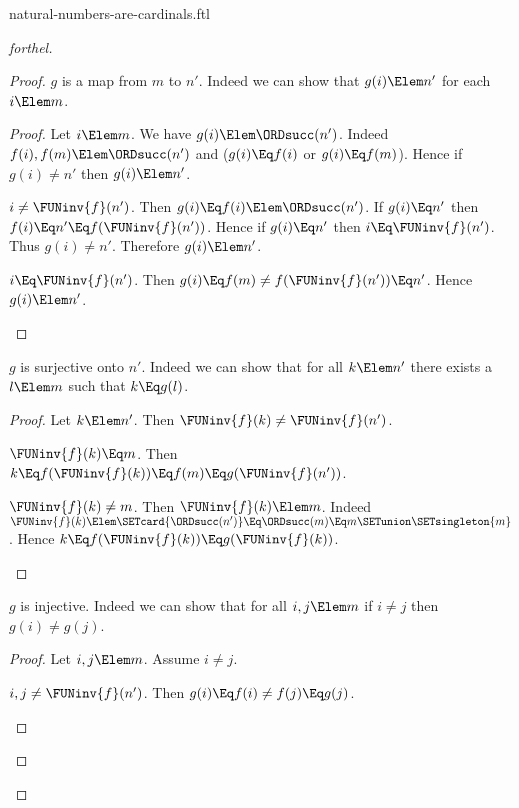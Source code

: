 \documentclass{stex}
\begin{document}
\begin{smodule}{natural-numbers-are-cardinals.ftl}
\begin{proof}[forthel]
\begin{proof}
      $g$ is a map from $m$ to $n'$.
      Indeed we can show that $g(i) \Elem n'$ for each $i \Elem m$.
      \begin{proof}
        Let $i \Elem m$.
        We have $g(i) \Elem \ORDsucc(n')$.
        Indeed $f(i), f(m) \Elem \ORDsucc(n')$ and ($g(i) \Eq f(i)$ or $g(i) \Eq f(m)$).
        Hence if $g(i) \neq n'$ then $g(i) \Elem n'$.

        \begin{case}{$i \neq \FUNinv{f}(n')$.}
          Then $g(i) \Eq f(i) \Elem \ORDsucc(n')$.
          If $g(i) \Eq n'$ then $f(i) \Eq n' \Eq f(\FUNinv{f}(n'))$.
          Hence if $g(i) \Eq n'$ then $i \Eq \FUNinv{f}(n')$.
          Thus $g(i) \neq n'$.
          Therefore $g(i) \Elem n'$.
        \end{case}

        \begin{case}{$i \Eq \FUNinv{f}(n')$.}
          Then $g(i)
            \Eq f(m)
            \neq f(\FUNinv{f}(n'))
            \Eq n'$.
          Hence $g(i) \Elem n'$.
        \end{case}
      \end{proof}

      $g$ is surjective onto $n'$.
      Indeed we can show that for all $k \Elem n'$ there exists a $l \Elem m$ such that $k \Eq g(l)$.
      \begin{proof}
        Let $k \Elem n'$.
        Then $\FUNinv{f}(k) \neq \FUNinv{f}(n')$.

        \begin{case}{$\FUNinv{f}(k) \Eq m$.}
          Then $k
            \Eq f(\FUNinv{f}(k))
            \Eq f(m)
            \Eq g(\FUNinv{f}(n'))$.
        \end{case}

        \begin{case}{$\FUNinv{f}(k) \neq m$.}
          Then $\FUNinv{f}(k) \Elem m$.
          Indeed $\FUNinv{f}(k) \Elem \SETcard{\ORDsucc(n')} \Eq \ORDsucc(m) \Eq m \SETunion \SETsingleton{m}$.
          Hence $k
            \Eq f(\FUNinv{f}(k))
            \Eq g(\FUNinv{f}(k))$.
        \end{case}
      \end{proof}

      $g$ is injective.
      Indeed we can show that for all $i, j \Elem m$ if $i \neq j$ then $g(i) \neq g(j)$.
      \begin{proof}
        Let $i, j \Elem m$.
        Assume $i \neq j$.

        \begin{case}{$i, j \neq \FUNinv{f}(n')$.}
          Then $g(i)
            \Eq f(i)
            \neq f(j)
            \Eq g(j)$.
        \end{case}


\end{proof}
\end{proof}
\end{proof}
\end{smodule}
\end{document}
